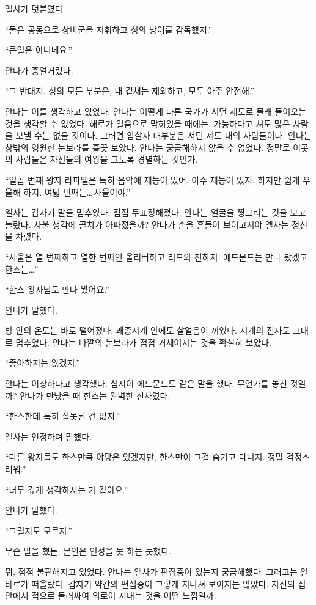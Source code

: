 엘사가 덧붙였다.

``둘은 공동으로 상비군을 지휘하고 성의 방어를 감독했지.''

``큰일은 아니네요.''

안나가 중얼거렸다.

``그 반대지. 성의 모든 부분은, 내 곁채는 제외하고, 모두 아주 안전해.''

안나는 이를 생각하고 있었다. 안나는 어떻게 다른 국가가 서던 제도로 몰래 들어오는 것을 생각할 수 없었다. 해로가 얼음으로 막혀있을 때에는. 가능하다고 쳐도 많은 사람을 보낼 수는 없을 것이다. 그러면 암살자 대부분은 서던 제도 내의 사람들이다. 안나는 창밖의 영원한 눈보라를 흘끗 보았다. 안나는 궁금해하지 않을 수 없었다. 정말로 이곳의 사람들은 자신들의 여왕을 그토록 경멸하는 것인가.

``일곱 번째 왕자 라파엘은 특히 음악에 재능이 있어. 아주 재능이 있지. 하지만 쉽게 우울해 하지. 여덟 번째는\ldots\,사울이야.''

엘사는 갑자기 말을 멈추었다. 점점 무표정해졌다. 안나는 얼굴을 찡그리는 것을 보고 놀랐다. 사울 생각에 골치가 아파졌을까? 안나가 손을 흔들어 보이고서야 엘사는 정신을 차렸다.

``사울은 열 번째하고 열한 번째인 올리버하고 리드와 친하지. 에드문드는 만나 봤겠고. 한스는\ldots''

``한스 왕자님도 만나 봤어요.''

안나가 말했다.

방 안의 온도는 바로 떨어졌다. 괘종시계 안에도 살얼음이 끼었다. 시계의 진자도 그대로 멈추었다. 안나는 바깥의 눈보라가 점점 거세어지는 것을 확실히 보았다.

`` 좋아하지는 않겠지.''

안나는 이상하다고 생각했다. 심지어 에드문드도 같은 말을 했다. 무언가를 놓친 것일까? 안나가 만났을 때 한스는 완벽한 신사였다.

``한스한테 특히 잘못된 건 없지.''

엘사는 인정하며 말했다.

``다른 왕자들도 한스만큼 야망은 있겠지만, 한스만이 그걸 숨기고 다니지. 정말 걱정스러워.''

``너무 깊게 생각하시는 거 같아요.''

안나가 말했다.

``그럴지도 모르지.''

무슨 말을 했든, 본인은 인정을 못 하는 듯했다.

뭐, 점점 불편해지고 있었다. 안나는 엘사가 편집증이 있는지 궁금해했다. 그러고는 알바르가 떠올랐다. 갑자기 약간의 편집증이 그렇게 지나쳐 보이지는 않았다. 자신의 집 안에서 적으로 둘러싸여 외로이 지내는 것을 어떤 느낌일까.

